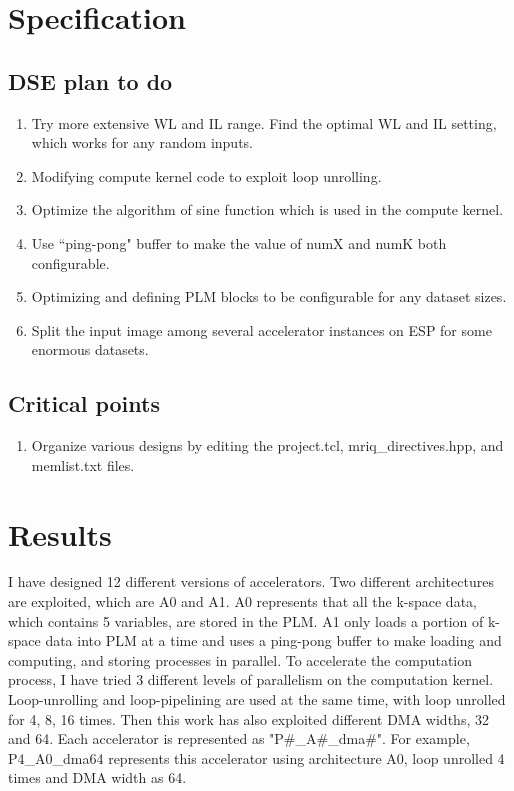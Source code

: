 \documentclass{sig-alternate}
\begin{document}
\section{Specification}
\subsection{DSE plan to do}
\begin{enumerate}
\setlength\itemsep{-0.15em}
\item Try more extensive WL and IL range. Find the optimal WL and IL setting, which works for any random inputs.
\item Modifying compute kernel code to exploit loop unrolling.
\item Optimize the algorithm of sine function which is used in the compute kernel.
\item Use ``ping-pong" buffer to make the value of numX and numK both configurable.
\item Optimizing and defining PLM blocks to be configurable for any dataset sizes.
\item Split the input image among several accelerator instances on ESP for some enormous datasets.
\end{enumerate}

\subsection{Critical points}

\begin{enumerate}
\setlength\itemsep{-0.15em}
\item Organize various designs by editing the project.tcl, mriq\_directives.hpp, and memlist.txt files.

\end{enumerate}

\section{Results}
I have designed 12 different versions of accelerators. Two different architectures are exploited, which are A0 and A1. A0 represents that all the k-space data, which contains 5 variables, are stored in the PLM. A1 only loads a portion of k-space data into PLM at a time and uses a ping-pong buffer to make loading and computing, and storing processes in parallel. To accelerate the computation process, I have tried 3 different levels of parallelism on the computation kernel. Loop-unrolling and loop-pipelining are used at the same time, with loop unrolled for 4, 8, 16 times. Then this work has also exploited different DMA widths, 32 and 64. Each accelerator is represented as "P\#\_A\#\_dma\#". For example, P4\_A0\_dma64 represents this accelerator using architecture A0, loop unrolled 4 times and DMA width as 64. \\
\end{document}
